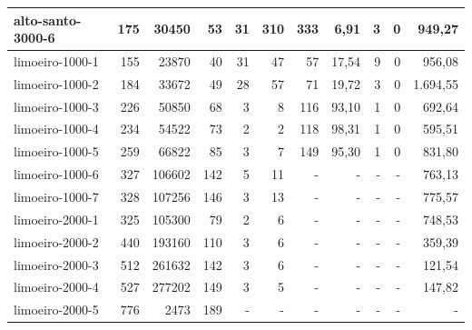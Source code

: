\begin{table}[ht!]
{\begin{tabular}{lrrrrrrrrrr}
			\rowcolor{rowlight}alto-santo-3000-6                                                   & 175 & 30450  & 53  & 31 & 310 & 333 & 6,91  & 3   & 0 & 949,27   \\
			\midrule
			\rowcolor{rowlight}limoeiro-1000-1                                                     & 155 & 23870  & 40  & 31 & 47  & 57  & 17,54 & 9   & 0 & 956,08   \\
			\rowcolor{rowlight}limoeiro-1000-2                                                     & 184 & 33672  & 49  & 28 & 57  & 71  & 19,72 & 3   & 0 & 1.694,55 \\
			\rowcolor{rowlight}limoeiro-1000-3                                                     & 226 & 50850  & 68  & 3  & 8   & 116 & 93,10 & 1   & 0 & 692,64   \\
			\rowcolor{rowlight}limoeiro-1000-4                                                     & 234 & 54522  & 73  & 2  & 2   & 118 & 98,31 & 1   & 0 & 595,51   \\
			\rowcolor{rowlight}limoeiro-1000-5                                                     & 259 & 66822  & 85  & 3  & 7   & 149 & 95,30 & 1   & 0 & 831,80   \\
			\rowcolor{rowlight}limoeiro-1000-6                                                     & 327 & 106602 & 142 & 5  & 11  & -   & -     & -   & - & 763,13   \\
			\rowcolor{rowlight}limoeiro-1000-7                                                     & 328 & 107256 & 146 & 3  & 13  & -   & -     & -   & - & 775,57   \\
			\rowcolor{rowlight}limoeiro-2000-1                                                     & 325 & 105300 & 79  & 2  & 6   & -   & -     & -   & - & 748,53   \\
			\rowcolor{rowlight}limoeiro-2000-2                                                     & 440 & 193160 & 110 & 3  & 6   & -   & -     & -   & - & 359,39   \\
			\rowcolor{rowlight}limoeiro-2000-3                                                     & 512 & 261632 & 142 & 3  & 6   & -   & -     & -   & - & 121,54   \\
			\rowcolor{rowlight}limoeiro-2000-4                                                     & 527 & 277202 & 149 & 3  & 5   & -   & -     & -   & - & 147,82   \\
			limoeiro-2000-5                                                                        & 776 & 2473   & 189 & -  & -   & -   & -     & -   & - & -        \\

\end{tabular}}
\end{table}
